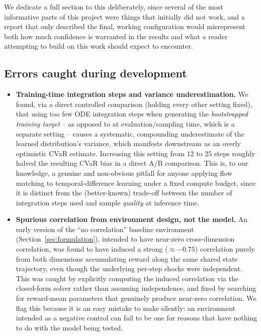 \documentclass[11pt]{article}
\begin{document}
We dedicate a full section to this deliberately, since several of the most informative parts of this project were things that initially did not work, and a report that only described the final, working configuration would misrepresent both how much confidence is warranted in the results and what a reader attempting to build on this work should expect to encounter.

\subsection{Errors caught during development}
\begin{itemize}[leftmargin=*]
\item \textbf{Training-time integration steps and variance underestimation.} We found, via a direct controlled comparison (holding every other setting fixed), that using too few ODE integration steps when generating the \emph{bootstrapped training target} -- as opposed to at evaluation/sampling time, which is a separate setting -- causes a systematic, compounding underestimate of the learned distribution's variance, which manifests downstream as an overly optimistic CVaR estimate. Increasing this setting from $12$ to $25$ steps roughly halved the resulting CVaR bias in a direct A/B comparison. This is, to our knowledge, a genuine and non-obvious pitfall for anyone applying flow matching to temporal-difference learning under a fixed compute budget, since it is distinct from the (better-known) trade-off between the number of integration steps used and sample \emph{quality} at inference time.
\item \textbf{Spurious correlation from environment design, not the model.} An early version of the ``no correlation'' baseline environment (Section~\ref{sec:formulation}), intended to have near-zero cross-dimension correlation, was found to have induced a strong ($\approx -0.75$) correlation purely from both dimensions accumulating reward along the same shared state trajectory, even though the underlying per-step shocks were independent. This was caught by explicitly computing the induced correlation via the closed-form solver rather than assuming independence, and fixed by searching for reward-mean parameters that genuinely produce near-zero correlation. We flag this because it is an easy mistake to make silently: an environment intended as a negative control can fail to be one for reasons that have nothing to do with the model being tested.

\end{itemize}
\end{document}
